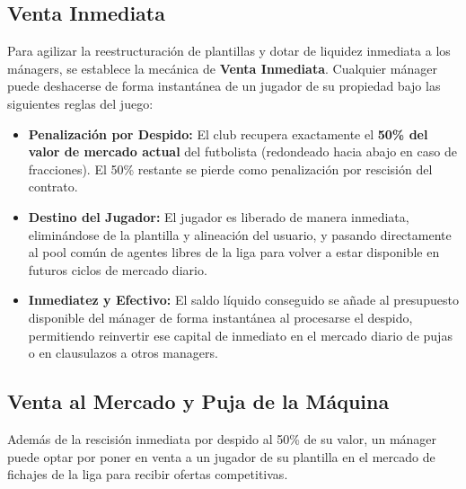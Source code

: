\subsection{Venta Inmediata}
Para agilizar la reestructuración de plantillas y dotar de liquidez inmediata a los mánagers, se establece la mecánica de \textbf{Venta Inmediata}. Cualquier mánager puede deshacerse de forma instantánea de un jugador de su propiedad bajo las siguientes reglas del juego:
\begin{itemize}
    \item \textbf{Penalización por Despido:} El club recupera exactamente el \textbf{50\% del valor de mercado actual} del futbolista (redondeado hacia abajo en caso de fracciones). El 50\% restante se pierde como penalización por rescisión del contrato.
    \item \textbf{Destino del Jugador:} El jugador es liberado de manera inmediata, eliminándose de la plantilla y alineación del usuario, y pasando directamente al pool común de agentes libres de la liga para volver a estar disponible en futuros ciclos de mercado diario.
    \item \textbf{Inmediatez y Efectivo:} El saldo líquido conseguido se añade al presupuesto disponible del mánager de forma instantánea al procesarse el despido, permitiendo reinvertir ese capital de inmediato en el mercado diario de pujas o en clausulazos a otros managers.
\end{itemize}

\subsection{Venta al Mercado y Puja de la Máquina}
Además de la rescisión inmediata por despido al 50\% de su valor, un mánager puede optar por poner en venta a un jugador de su plantilla en el mercado de fichajes de la liga para recibir ofertas competitivas.

